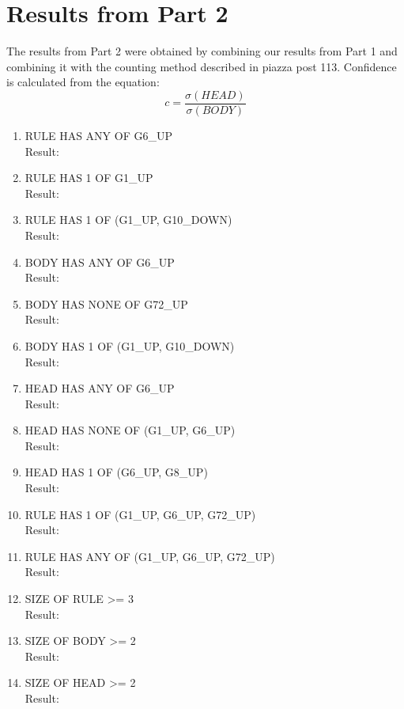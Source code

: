 \documentclass[12pt]{article}
\begin{document}
\section*{Results from Part 2}
\noindent The results from Part 2 were obtained by combining our results from Part 1 and combining it with the counting method described in piazza post 113. Confidence is calculated from the equation: \\
$$c = \frac{\sigma(HEAD)}{\sigma(BODY)}$$
\begin{enumerate} 
	\item RULE HAS ANY OF G6\_UP \\
	Result: \\
	\item RULE HAS 1 OF G1\_UP \\
	Result: \\
	\item RULE HAS 1 OF (G1\_UP, G10\_DOWN) \\
	Result: \\
	\item BODY HAS ANY OF G6\_UP \\
	Result: \\
	\item BODY HAS NONE OF G72\_UP\\
	Result: \\
	\item BODY HAS 1 OF (G1\_UP, G10\_DOWN)\\
	Result: \\
	\item HEAD HAS ANY OF G6\_UP\\
	Result: \\
	\item HEAD HAS NONE OF (G1\_UP, G6\_UP)\\
	Result: \\
	\item HEAD HAS 1 OF (G6\_UP, G8\_UP)\\
	Result: \\
	\item RULE HAS 1 OF (G1\_UP, G6\_UP, G72\_UP)\\
	Result: \\
	\item RULE HAS ANY OF (G1\_UP, G6\_UP, G72\_UP)\\
	Result: \\

	\item SIZE OF RULE >= 3 \\
	Result: \\
	\item SIZE OF BODY >= 2 \\
	Result: \\
	\item SIZE OF HEAD >= 2 \\
	Result: \\


\end{enumerate}
\end{document}
